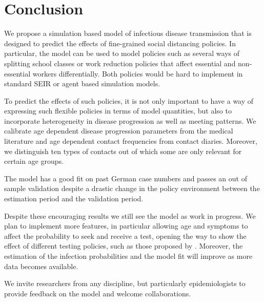 \section{Conclusion}
\label{sec:conclusion}

We propose a simulation based model of infectious disease transmission that is designed
to predict the effects of fine-grained social distancing policies. In particular, the
model can be used to model policies such as several ways of splitting school classes or
work reduction policies that affect essential and non-essential workers differentially.
Both policies would be hard to implement in standard SEIR or agent based simulation
models.

To predict the effects of such policies, it is not only important to have a way of
expressing such flexible policies in terms of model quantities, but also to incorporate
heterogeneity in disease progression as well as meeting patterns. We calibrate age
dependent disease progression parameters from the medical literature and age dependent
contact frequencies from contact diaries. Moreover, we distinguish ten types of contacts
out of which some are only relevant for certain age groups.

The model has a good fit on past German case numbers and passes an out of sample
validation despite a drastic change in the policy environment between the estimation
period and the validation period.

Despite these encouraging results we still see the model as work in progress.
We plan to implement more features, in particular allowing age and symptoms to affect
the probability to seek and receive a test, opening the way to show the effect of
different testing policies, such as those proposed by \cite{Troeger2020}.
Moreover, the estimation of the infection probabilities and the model fit will improve
as more data becomes available.

We invite researchers from any discipline, but particularly epidemiologists to provide
feedback on the model and welcome collaborations.
